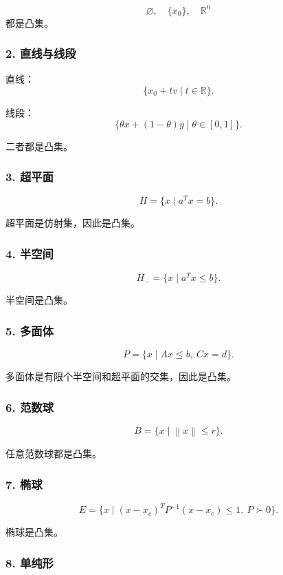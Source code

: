 \documentclass[11pt,a4paper]{ctexart}
\newcommand{\R}{\mathbb{R}}
\newcommand{\norm}[1]{\left\lVert #1 \right\rVert}
\theoremstyle{definition}
\theoremstyle{plain}
\theoremstyle{remark}
\begin{document}
\[
    \varnothing,\quad \{x_0\},\quad \R^n
\]
都是凸集。

\subsubsection*{2. 直线与线段}

直线：
\[
    \{x_0+tv\mid t\in\R\}.
\]

线段：
\[
    \{\theta x+(1-\theta)y\mid \theta\in[0,1]\}.
\]

二者都是凸集。

\subsubsection*{3. 超平面}

\[
    H=\{x\mid a^Tx=b\}.
\]

超平面是仿射集，因此是凸集。

\subsubsection*{4. 半空间}

\[
    H_-=\{x\mid a^Tx\le b\}.
\]

半空间是凸集。

\subsubsection*{5. 多面体}

\[
    P=\{x\mid Ax\le b,\ Cx=d\}.
\]

多面体是有限个半空间和超平面的交集，因此是凸集。

\subsubsection*{6. 范数球}

\[
    B=\{x\mid \norm{x}\le r\}.
\]

任意范数球都是凸集。

\subsubsection*{7. 椭球}

\[
    E=\{x\mid (x-x_c)^TP^{-1}(x-x_c)\le1,\ P\succ0\}.
\]

椭球是凸集。

\subsubsection*{8. 单纯形}
\end{document}
